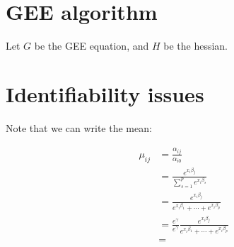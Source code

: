 \documentclass[10pt]{article}
\theoremstyle{definition}
\begin{document}
\begin{align*}
\end{align*}

\section{GEE algorithm}

Let $G$ be the GEE equation, and $H$ be the hessian.




\section{Identifiability issues}

Note that we can write the mean:

\begin{align*}
  \mu_{ij} &= \frac{\alpha_{ij}}{\alpha_{i0}}\\
  &= \frac{e^{x_i\beta_j}}{\sum_{s = 1}^p e^{x_i\beta_s }}\\
  &= \frac{e^{x_i\beta_j}}{e^{x_i\beta_1} + \cdots + e^{x_i\beta_p}}\\
  &= \frac{e^{\gamma}}{e^{\gamma}}\frac{e^{x_i\beta_j}}{e^{x_i\beta_1} + \cdots + e^{x_i\beta_p}}\\
  &=
\end{align*}
\end{document}
